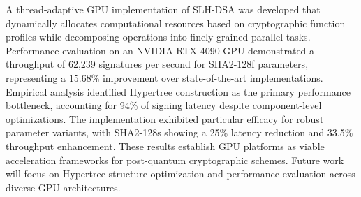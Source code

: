 \documentclass[journal]{IEEEtran}
\begin{document}
A thread-adaptive GPU implementation of SLH-DSA was developed that dynamically allocates computational resources based on cryptographic function profiles while decomposing operations into finely-grained parallel tasks. Performance evaluation on an NVIDIA RTX 4090 GPU demonstrated a throughput of 62,239 signatures per second for SHA2-128f parameters, representing a 15.68\% improvement over state-of-the-art implementations. Empirical analysis identified Hypertree construction as the primary performance bottleneck, accounting for 94\% of signing latency despite component-level optimizations. The implementation exhibited particular efficacy for robust parameter variants, with SHA2-128s showing a 25\% latency reduction and 33.5\% throughput enhancement. These results establish GPU platforms as viable acceleration frameworks for post-quantum cryptographic schemes. Future work will focus on Hypertree structure optimization and performance evaluation across diverse GPU architectures.





\end{document}
